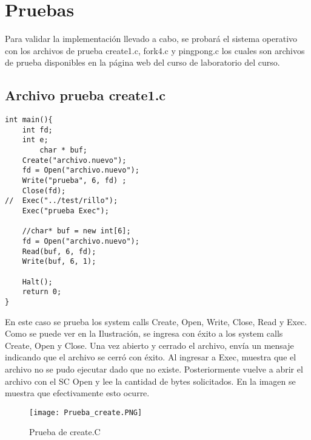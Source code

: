 \section{Pruebas}
  Para validar la implementación llevado a cabo, se probará  el sistema operativo con los archivos de prueba create1.c, fork4.c y pingpong.c los cuales son archivos de prueba disponibles en la página web del curso de laboratorio del curso. 
  \subsection{Archivo prueba create1.c}
    \begin{lstlisting}
int main(){
	int fd;
	int e;
        char * buf;
	Create("archivo.nuevo");
	fd = Open("archivo.nuevo");
	Write("prueba", 6, fd) ;
	Close(fd);
//	Exec("../test/rillo");	
	Exec("prueba Exec");

	//char* buf = new int[6];
	fd = Open("archivo.nuevo");
	Read(buf, 6, fd);
	Write(buf, 6, 1);

	Halt();
	return 0;
}      
    \end{lstlisting}
En este caso se prueba los system calls Create, Open, Write, Close, Read y Exec. Como se puede ver en la Ilustración, se ingresa con éxito a los system calls Create, Open y Close. Una vez abierto y cerrado el archivo, envía un mensaje indicando que el archivo se cerró con éxito.
Al ingresar a Exec, muestra que el archivo no se pudo ejecutar dado que no existe. Posteriormente vuelve a abrir el archivo con el SC Open y lee la cantidad de bytes solicitados. En la imagen se muestra que efectivamente esto ocurre.
    \begin{figure}[hbt]
      \begin{center}
        \texttt{[image: Prueba\_create.PNG]}
        \caption{Prueba de create.C}
        \label{fig:create}
      \end{center}
    \end{figure}

